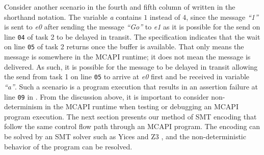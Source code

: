 Consider another scenario in the fourth and fifth column of  written in the shorthand notation. The variable \textit{a} contains $1$ instead of $4$, since the message \textit{``1''} is sent to \textit{e0} after sending the message \textit{``Go''} to \textit{e1} as it is possible for the send on line \texttt{04} of task 2 to be delayed in transit. The specification indicates that the wait on line \texttt{05} of task 2 returns once the buffer is available. That only means the message is somewhere in the MCAPI runtime; it does not mean the message is delivered. As such, it is possible for the message to be delayed in transit allowing the send from task 1 on line \texttt{05} to arrive at \textit{e0} first and be received in variable \textit{``a''}. Such a scenario is a program execution that results in an assertion failure at line \texttt{09} in . From the discussion above, it is important to consider non-determinism in the MCAPI runtime when testing or debugging an MCAPI program execution. The next section presents our method of SMT encoding that follow the same control flow path through an MCAPI program. The encoding can be solved by an SMT solver such as Yices \cite{dutertre:CAV06} and Z3 \cite{demoura:tacas08}, and the non-deterministic behavior of the program can be resolved.

